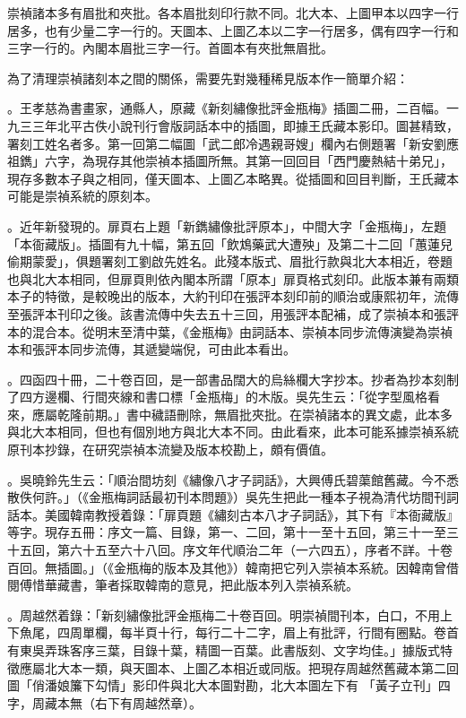 崇禎諸本多有眉批和夾批。各本眉批刻印行款不同。北大本、上圖甲本以四字一行居多，也有少量二字一行的。天圖本、上圖乙本以二字一行居多，偶有四字一行和三字一行的。內閣本眉批三字一行。首圖本有夾批無眉批。

為了清理崇禎諸刻本之間的關係，需要先對幾種稀見版本作一簡單介紹：

{\large{}}。王孝慈為書畫家，通縣人，原藏《新刻繡像批評金瓶梅》插圖二冊，二百幅。一九三三年北平古佚小說刊行會版詞話本中的插圖，即據王氏藏本影印。圖甚精致，署刻工姓名者多。第一回第二幅圖「武二郎冷遇親哥嫂」欄內右側題署「新安劉應祖鐫」六字，為現存其他崇禎本插圖所無。其第一回回目「西門慶熱結十弟兄」，現存多數本子與之相同，僅天圖本、上圖乙本略異。從插圖和回目判斷，王氏藏本可能是崇禎系統的原刻本。

{\large{}}。近年新發現的。扉頁右上題「新鐫繡像批評原本」，中間大字「金瓶梅」，左題「本衙藏版」。插圖有九十幅，第五回「飲鴆藥武大遭殃」及第二十二回「蕙蓮兒偷期蒙愛」，俱題署刻工劉啟先姓名。此殘本版式、眉批行款與北大本相近，卷題也與北大本相同，但扉頁則依內閣本所謂「原本」扉頁格式刻印。此版本兼有兩類本子的特徵，是較晚出的版本，大約刊印在張評本刻印前的順治或康熙初年，流傳至張評本刊印之後。該書流傳中失去五十三回，用張評本配補，成了崇禎本和張評本的混合本。從明末至清中葉，《金瓶梅》由詞話本、崇禎本同步流傳演變為崇禎本和張評本同步流傳，其遞變端倪，可由此本看出。

{\large{}}。四函四十冊，二十卷百回，是一部書品闊大的烏絲欄大字抄本。抄者為抄本刻制了四方邊欄、行間夾線和書口標「金瓶梅」的木版。吳先生云：「從字型風格看來，應屬乾隆前期。」書中穢語刪除，無眉批夾批。在崇禎諸本的異文處，此本多與北大本相同，但也有個別地方與北大本不同。由此看來，此本可能系據崇禎系統原刊本抄錄，在研究崇禎本流變及版本校勘上，頗有價值。

{\large{}}。吳曉鈴先生云：「順治間坊刻《繡像八才子詞話》，大興傅氏碧蕖館舊藏。今不悉散佚何許。」（《金瓶梅詞話最初刊本問題》）吳先生把此一種本子視為清代坊間刊詞話本。美國韓南教授着錄：「扉頁題《繡刻古本八才子詞話》，其下有『本衙藏版』等字。現存五冊：序文一篇、目錄，第一、二回，第十一至十五回，第三十一至三十五回，第六十五至六十八回。序文年代順治二年（一六四五），序者不詳。十卷百回。無插圖。」（《金瓶梅的版本及其他》）韓南把它列入崇禎本系統。因韓南曾借閱傅惜華藏書，筆者採取韓南的意見，把此版本列入崇禎系統。

{\large{}}。周越然着錄：「新刻繡像批評金瓶梅二十卷百回。明崇禎間刊本，白口，不用上下魚尾，四周單欄，每半頁十行，每行二十二字，眉上有批評，行間有圈點。卷首有東吳弄珠客序三葉，目錄十葉，精圖一百葉。此書版刻、文字均佳。」據版式特徵應屬北大本一類，與天圖本、上圖乙本相近或同版。把現存周越然舊藏本第二回圖「俏潘娘簾下勾情」影印件與北大本圖對勘，北大本圖左下有 「黃子立刊」四字，周藏本無（右下有周越然章）。

